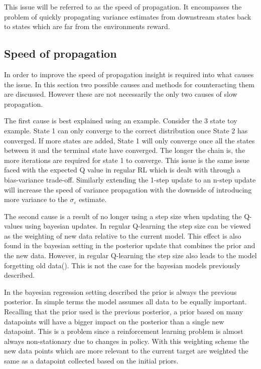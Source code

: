 This issue will be referred to as the speed of propagation. It encompasses the problem of quickly propagating variance estimates from downstream states back to states which are far from the environments reward.

\subsection{Speed of propagation}

In order to improve the speed of propagation insight is required into what causes the issue. In this section two possible causes and methods for counteracting them are discussed. However these are not necessarily the only two causes of slow propagation.

The first cause is best explained using an example. Consider the 3 state toy example. State 1 can only converge to the correct distribution once State 2 has converged. If more states are added, State 1 will only converge once all the states between it and the terminal state have converged. The longer the chain is, the more iterations are required for state 1 to converge. This issue is the same issue faced with the expected Q value in regular RL which is dealt with through a bias-variance trade-off. Similarly extending the 1-step update to an n-step update will increase the speed of variance propagation with the downside of introducing more variance to the $\sigma_\varepsilon$ estimate.

The second cause is a result of no longer using a step size when updating the Q-values using bayesian updates. In regular Q-learning the step size can be viewed as the weighting of new data relative to the current model. This effect is also found in the bayesian setting in the posterior update that combines the prior and the new data. However, in regular Q-learning the step size also leads to the model forgetting old data(\citep[p~.229]{sutton_barto_2018}). This is not the case for the bayesian models previously described.

In the bayesian regression setting described the prior is always the previous posterior. In simple terms the model assumes all data to be equally important. Recalling that the prior used is the previous posterior, a prior based on many datapoints will have a bigger impact on the posterior than a single new datapoint. This is a problem since a reinforcement learning problem is almost always non-stationary due to changes in policy. With this weighting scheme the new data points which are more relevant to the current target are weighted the same as a datapoint collected based on the initial priors.

